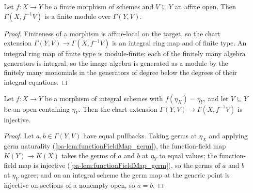 \begin{lemma}
  \label{pa-lem:moduleFinite_pullbackSections}
  \leanok

  Let \(f : X \to Y\) be a finite morphism of schemes and \(V \subseteq Y\) an affine
  open. Then \(\Gamma(X, f^{-1}V)\) is a finite module over \(\Gamma(Y, V)\).
\end{lemma}
\begin{proof}
  \leanok
  Finiteness of a morphism is affine-local on the target, so the chart extension
  \(\Gamma(Y, V) \to \Gamma(X, f^{-1}V)\) is an integral ring map and of finite type.
  An integral ring map of finite type is module-finite: each of the finitely many
  algebra generators is integral, so the image algebra is generated as a module by the
  finitely many monomials in the generators of degree below the degrees of their
  integral equations.
\end{proof}

\begin{lemma}
  \label{pa-lem:faithfulSMul_pullbackSections}
  \leanok

  Let \(f : X \to Y\) be a morphism of integral schemes with \(f(\eta_X) = \eta_Y\),
  and let \(V \subseteq Y\) be an open containing \(\eta_Y\). Then the chart extension
  \(\Gamma(Y, V) \to \Gamma(X, f^{-1}V)\) is injective.
\end{lemma}
\begin{proof}
  \leanok
  Let \(a, b \in \Gamma(Y, V)\) have equal pullbacks. Taking germs at \(\eta_X\) and
  applying germ naturality (\ref{pa-lem:functionFieldMap_germ}), the function-field map
  \(K(Y) \to K(X)\) takes the germs of \(a\) and \(b\) at \(\eta_Y\) to equal values;
  the function-field map is injective (\ref{pa-lem:functionFieldMap_germ}), so the germs
  of \(a\) and \(b\) at \(\eta_Y\) agree; and on an integral scheme the germ map at the
  generic point is injective on sections of a nonempty open, so \(a = b\).
\end{proof}

